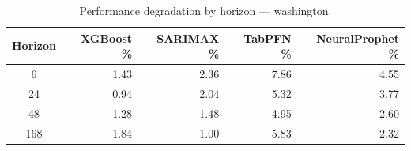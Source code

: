 \begin{table}[h]
\centering
\caption{Performance degradation by horizon — washington.}
\label{tab:degradation_horizon_washington}
\begin{tabular}{crrrr}
\toprule
Horizon & XGBoost \% & SARIMAX \% & TabPFN \% & NeuralProphet \% \\
\midrule
6 & 1.43 & 2.36 & 7.86 & 4.55 \\
24 & 0.94 & 2.04 & 5.32 & 3.77 \\
48 & 1.28 & 1.48 & 4.95 & 2.60 \\
168 & 1.84 & 1.00 & 5.83 & 2.32 \\
\bottomrule
\end{tabular}
\end{table}
